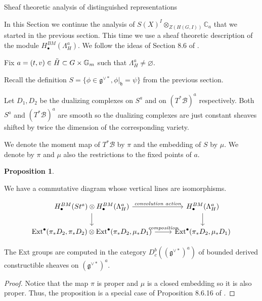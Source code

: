 \documentclass[12pt]{article}
\newcommand{\B}{\mathcal{B}}
\newcommand{\C}{\mathbb{C}}
\newcommand{\<}{\langle}
\renewcommand{\>}{\rangle}
\renewcommand{\emptyset}{\varnothing}
\theoremstyle{plain}
\theoremstyle{definition}
\newtheorem{prop}[theorem]{Proposition}
\begin{document}
\begin{section}{Sheaf theoretic analysis of distinguished representations}\label{s9}

In this Section we continue the analysis of $S(X)^I\otimes_{Z(H(G,I))} \C_a$  that we started in the previous section. This time we use a sheaf theoretic description of the module $H^{BM}_\bullet(\Lambda_H^a)$. We follow the ideas of Section 8.6 of \cite{Chriss1997RepresentationTA}.

Fix $a=(t,v)\in \Tilde{H}\subset G\times\mathbb{G}_m$ such that $\Lambda_H^a\neq\emptyset$.

Recall the definition $S=\{\phi\in \mathfrak{g}^{\vee*},\phi|_\mathfrak{h}=\psi\}$ from the previous section.

Let $D_1,D_2$ be the dualizing complexes on $S^a$ and on $(T^*\B)^a$ respectively. Both $S^a$ and $(T^*\B)^a$ are smooth so the dualizing complexes are just constant sheaves shifted by twice the dimension of the corresponding variety.

We denote the moment map of $T^*\B$ by $\pi$ and the embedding of $S$ by $\mu$. We denote by $\pi$ and $\mu$ also the restrictions to the fixed points of $a$.

\begin{prop}\label{pass to Ext}

We have a commutative diagram whose vertical lines are isomorphisms.

    \[
    \begin{tikzcd}
H^{BM}_{\bullet}(St^a) \otimes H^{BM}_{\bullet}(\Lambda_H^a) 
    \arrow[r, "\textit{convolution action}"] 
    \arrow[d]
& H^{BM}_{\bullet}(\Lambda_H^a) 
    \arrow[d] \\
\text{Ext}^\bullet(\pi_*D_2, \pi_*D_2) \otimes \text{Ext}^\bullet(\pi_*D_2, \mu_*D_1) 
    \arrow[r, "\textit{composition}"] 
& \text{Ext}^\bullet(\pi_*D_2, \mu_*D_1)
\end{tikzcd}
\]

The Ext groups are computed in the category ${D_c^b((\mathfrak{g}^{\vee*})^a)}$ of bounded derived constructible sheaves on  $(\mathfrak{g}^{\vee*})^a$.

\end{prop}

\begin{proof}
Notice that the map $\pi$ is proper and $\mu$ is a closed embedding so it is also proper. Thus, the proposition is a special case of Proposition 8.6.16 of \cite{Chriss1997RepresentationTA}.     
\end{proof}



\end{section}
\end{document}
